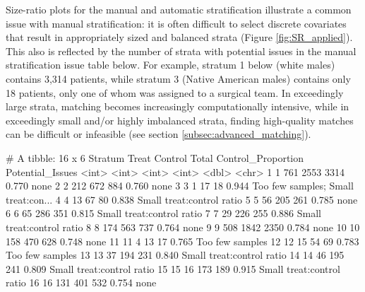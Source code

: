 Size-ratio plots for the manual and automatic stratification illustrate a common issue with manual stratification: it is often difficult to select discrete covariates that result in appropriately sized and balanced strata (Figure \ref{fig:SR_applied}).  This also is reflected by the number of strata with potential issues in the manual stratification issue table below. For example, stratum 1 below (white males) contains 3,314 patients, while stratum 3 (Native American males) contains only 18 patients, only one of whom was assigned to a surgical team.  In exceedingly large strata, matching becomes increasingly computationally intensive, while in exceedingly small and/or highly imbalanced strata, finding high-quality matches can be difficult or infeasible (see section \ref{subsec:advanced_matching}).

\begin{example}
# A tibble: 16 x 6
   Stratum Treat Control Total Control_Proportion Potential_Issues                          
     <int> <int>   <int> <int>              <dbl> <chr>                                     
 1       1   761    2553  3314              0.770 none                                      
 2       2   212     672   884              0.760 none                                      
 3       3     1      17    18              0.944 Too few samples; Small treat:con...
 4       4    13      67    80              0.838 Small treat:control ratio                 
 5       5    56     205   261              0.785 none                                      
 6       6    65     286   351              0.815 Small treat:control ratio                 
 7       7    29     226   255              0.886 Small treat:control ratio                 
 8       8   174     563   737              0.764 none                                      
 9       9   508    1842  2350              0.784 none                                      
10      10   158     470   628              0.748 none                                      
11      11     4      13    17              0.765 Too few samples                           
12      12    15      54    69              0.783 Too few samples                           
13      13    37     194   231              0.840 Small treat:control ratio                 
14      14    46     195   241              0.809 Small treat:control ratio                 
15      15    16     173   189              0.915 Small treat:control ratio                 
16      16   131     401   532              0.754 none 
\end{example}

